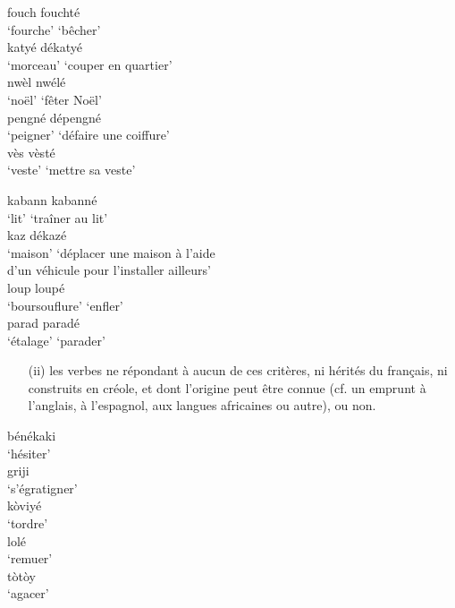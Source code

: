 \documentclass[output=paper]{langsci/langscibook}
\begin{document}
\ex\label{ex:VilloingDeglas:7}

  \ea \gll fouch \textrightarrow{~} fouchté\\
  {`fourche'} {} {`bêcher'}\\
  \ex \gll katyé \textrightarrow{~} dékatyé\\
  {`morceau'} {} {`couper en quartier'}\\
  \ex \gll nwèl \textrightarrow{~} nwélé\\
  {`noël'} {} {`fêter Noël'}\\
  \ex \gll pengné \textrightarrow{~} dépengné\\
  {`peigner'} {} {`défaire une coiffure'}\\
  \ex \gll vès \textrightarrow{~} vèsté\\
  {`veste'} {} {`mettre sa veste'}\\
  \z

\ex\label{ex:VilloingDeglas:8}

  \ea \gll kabann \textrightarrow{~} kabanné\\
  {`lit'} {} {`traîner au lit'}\\
  \ex \glll kaz \textrightarrow{~} dékazé\\
  {`maison'} {} {`déplacer une maison à l'aide}\\
  {} {} {d'un véhicule pour l'installer ailleurs'}\\
  \ex \gll loup \textrightarrow{~} loupé\\
  {`boursouflure'} {} {`enfler'}\\
  \ex \gll parad \textrightarrow{~} paradé\\
  {`étalage'} {} {`parader'}\\
  \z
\z

\begin{enumerate}

\item[(ii)]
  les verbes ne répondant à aucun de ces critères, ni hérités du
  français, ni construits en créole, et dont l'origine peut être 
  connue (cf. un emprunt à l'anglais, à l'espagnol, aux langues
  africaines ou autre), ou non.
\end{enumerate}

\ea\label{ex:VilloingDeglas:9}

  \ea \gll bénékaki \\
  `hésiter'\\
  \ex \gll griji \\
  `s'égratigner'\\
  \ex \gll kòviyé \\
  `tordre'\\
  \ex \gll lolé \\
  `remuer'\\
  \ex \gll tòtòy \\
  `agacer'\\
\z\z
\end{document}

